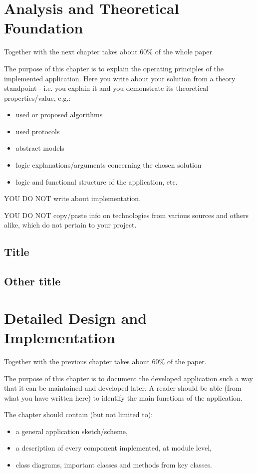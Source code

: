 \documentclass[12pt,a4paper,twoside]{report}
\begin{document}
\chapter{Analysis and Theoretical Foundation}
\label{ch:analysis}

Together with the next chapter takes about 60\% of the whole paper

The purpose of this chapter is to explain the operating principles of the implemented application.
Here you write about your solution from a theory standpoint - i.e. you explain it and you demonstrate its theoretical properties/value, e.g.:
\begin{itemize}
 \item used or proposed algorithms
 \item used protocols
 \item abstract models
 \item logic explanations/arguments concerning the chosen solution
 \item logic and functional structure of the application, etc.
\end{itemize}

{\color{red} YOU DO NOT write about implementation.

YOU DO NOT copy/paste info on technologies from various sources and others alike, which do not pertain to your project.
}

\section{Title}
\section{Other title}


\chapter{Detailed Design and Implementation}

Together with the previous chapter takes about 60\% of the paper.

The purpose of this chapter is to document the developed application such a way that it can be maintained and developed later. A reader should be able (from what you have written here) to identify the main functions of the application.

The chapter should contain (but not limited to):
\begin{itemize}
 \item a general application sketch/scheme,
\item a description of every component implemented, at module level,
\item class diagrams, important classes and methods from key classes.
\end{itemize}
\end{document}
